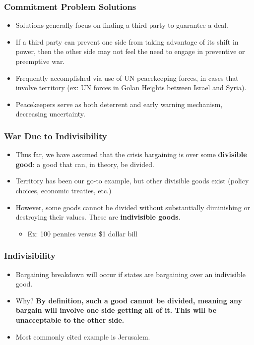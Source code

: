 \documentclass{beamer}
\begin{document}
\begin{frame} 
	\frametitle{\LARGE{Commitment Problem Solutions}}
	\begin{itemize}
		\item Solutions generally focus on finding a third party to guarantee a deal. \pause
		\item If a third party can prevent one side from taking advantage of its shift in power, then the other side may not feel the need to engage in preventive or preemptive war. \pause
		\item Frequently accomplished via use of UN peacekeeping forces, in cases that involve territory (ex: UN forces in Golan Heights between Israel and Syria). \pause
		\item Peacekeepers serve as both deterrent and early warning mechanism, decreasing uncertainty.
	\end{itemize}
\end{frame}

\begin{frame} 
	\frametitle{\LARGE{War Due to Indivisibility}}
	\begin{itemize}
		\item Thus far, we have assumed that the crisis bargaining is over some \textbf{divisible good}: a good that can, in theory, be divided.
		\item Territory has been our go-to example, but other divisible goods exist (policy choices, economic treaties, etc.)
		\item However, some goods cannot be divided without substantially diminishing or destroying their values. These are \textbf{indivisible goods}. \pause
		\begin{itemize}
			\item Ex: 100 pennies versus \$1 dollar bill
		\end{itemize}
	\end{itemize}
\end{frame}

\begin{frame} 
	\frametitle{\LARGE{Indivisibility}}
	\begin{itemize}
		\item Bargaining breakdown will occur if states are bargaining over an indivisible good. \pause
		\item Why? \textbf{By definition, such a good cannot be divided, meaning any bargain will involve one side getting all of it. This will be unacceptable to the other side.}
		\item Most commonly cited example is Jerusalem. 
	\end{itemize}
\end{frame}
\end{document}
